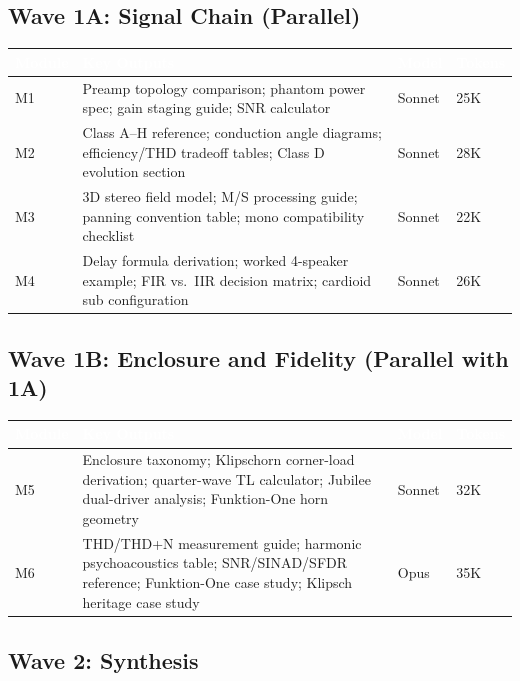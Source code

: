 \documentclass[11pt,letterpaper]{article}
\newcommand{\tableheader}[1]{\textbf{\sffamily\textcolor{white}{#1}}}
\begin{document}
\subsection{Wave 1A: Signal Chain (Parallel)}

\begin{center}
\begin{tabularx}{\textwidth}{L{2cm}XC{2cm}C{1.5cm}}
\toprule
{}
\tableheader{Module} & \tableheader{Key Outputs} & \tableheader{Model} & \tableheader{Tokens} \\
\midrule
M1 & Preamp topology comparison; phantom power spec; gain staging guide; SNR calculator & Sonnet & 25K \\
M2 & Class A--H reference; conduction angle diagrams; efficiency/THD tradeoff tables; Class D evolution section & Sonnet & 28K \\
M3 & 3D stereo field model; M/S processing guide; panning convention table; mono compatibility checklist & Sonnet & 22K \\
M4 & Delay formula derivation; worked 4-speaker example; FIR vs.\ IIR decision matrix; cardioid sub configuration & Sonnet & 26K \\
\bottomrule
\end{tabularx}
\end{center}

\subsection{Wave 1B: Enclosure and Fidelity (Parallel with 1A)}

\begin{center}
\begin{tabularx}{\textwidth}{L{2cm}XC{2cm}C{1.5cm}}
\toprule
{}
\tableheader{Module} & \tableheader{Key Outputs} & \tableheader{Model} & \tableheader{Tokens} \\
\midrule
M5 & Enclosure taxonomy; Klipschorn corner-load derivation; quarter-wave TL calculator; Jubilee dual-driver analysis; Funktion-One horn geometry & Sonnet & 32K \\
M6 & THD/THD+N measurement guide; harmonic psychoacoustics table; SNR/SINAD/SFDR reference; Funktion-One case study; Klipsch heritage case study & Opus & 35K \\
\bottomrule
\end{tabularx}
\end{center}

\subsection{Wave 2: Synthesis}
\end{document}
